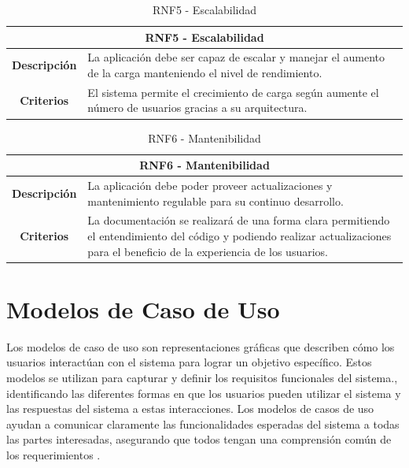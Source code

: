 \begin{table}[H]
    \centering
    \begin{tabular}{|c|p{10cm}|}
        \hline
        \multicolumn{2}{|c|}{\textbf{RNF5 - Escalabilidad}}                                                                                  \\
        \hline
        \textbf{Descripción} & La aplicación debe ser capaz de escalar y manejar el aumento de la carga manteniendo el nivel de rendimiento. \\
        \hline
        \textbf{Criterios}   & El sistema permite el crecimiento de carga según aumente el número de usuarios gracias a su arquitectura.     \\
        \hline
    \end{tabular}
    \caption{RNF5 - Escalabilidad}
\end{table}

\begin{table}[H]
    \centering
    \begin{tabular}{|c|p{10cm}|}
        \hline
        \multicolumn{2}{|c|}{\textbf{RNF6 - Mantenibilidad}}                                                                                                                                                     \\
        \hline
        \textbf{Descripción} & La aplicación debe poder proveer actualizaciones y mantenimiento regulable para su continuo desarrollo.                                                                           \\
        \hline
        \textbf{Criterios}   & La documentación se realizará de una forma clara permitiendo el entendimiento del código y podiendo realizar actualizaciones para el beneficio de la experiencia de los usuarios. \\
        \hline
    \end{tabular}
    \caption{RNF6 - Mantenibilidad}
\end{table}

\section{Modelos de Caso de Uso}

Los modelos de caso de uso son representaciones gráficas que describen cómo los usuarios interactúan con el sistema para lograr un objetivo específico. Estos modelos se utilizan para capturar y definir los requisitos funcionales del sistema., identificando las diferentes formas en que los usuarios pueden utilizar el sistema y las respuestas del sistema a estas interacciones. Los modelos de casos de uso ayudan a comunicar claramente las funcionalidades esperadas del sistema a todas las partes interesadas, asegurando que todos tengan una comprensión común de los requerimientos \cite{ibm}.

